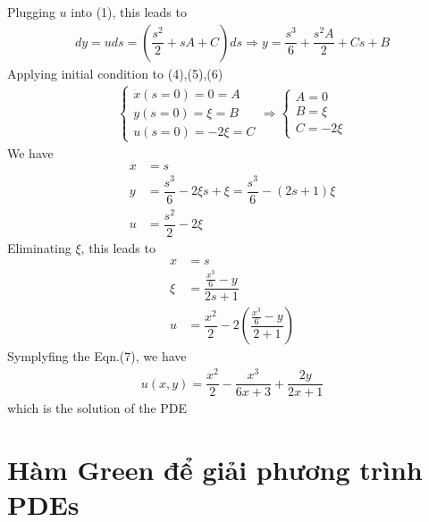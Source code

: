 \documentclass{article}
\newcommand{\f}[2]{\dfrac{#1}{#2}}
\begin{document}
Plugging $u$ into (1), this leads to
\begin{align*}
	dy = u ds = \left(\f{s^{2}}{2} + s A + C\right) ds \Rightarrow y = \f{s^{3}}{6} + \f{s^{2}A}{2} + C s +  B \tag{6}
\end{align*}
Applying initial condition to (4),(5),(6)
\begin{align*}
	\begin{cases}
		x(s = 0) = 0 = A   \\
		y(s = 0) = \xi = B \\
		u(s = 0) = -2\xi = C
	\end{cases}
	\Rightarrow
	\begin{cases}
		A = 0   \\
		B = \xi \\
		C = -2\xi
	\end{cases}
\end{align*}
We have
\begin{align*}
	x & = s                           \\
	y & = \f{s^{3}}{6} - 2\xi s + \xi =  \f{s^{3}}{6} - (2s + 1) \xi \\
	u & = \f{s^{2}}{2} - 2\xi
\end{align*}
Eliminating $\xi$, this leads to
\begin{align*}
	x & = s                                             \\
	\xi & = \f{\frac{x^{3}}{6} - y}{2s + 1}                  \\
	u & = \f{x^{2}}{2} - 2 \left( \f{\frac{x^{3}}{6} - y}{2 + 1} \right) \tag{7}
\end{align*}
Symplyfing the Eqn.(7), we have
\begin{align*}
	u(x,y) = \f{x^{2}}{2} - \f{x^{3}}{6x + 3} + \f{2y}{2x + 1}
\end{align*}
which is the solution of the PDE
\section{Hàm Green để giải phương trình PDEs}
\end{document}
